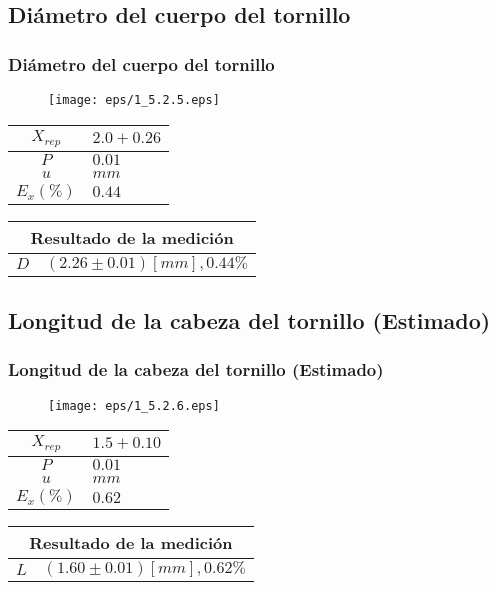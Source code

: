 \documentclass[letter,11pt]{beamer}
\begin{document}
\subsection{Diámetro del cuerpo del tornillo}
\begin{frame}
\frametitle{Diámetro del cuerpo del tornillo}
\vspace*{0.8cm}
\begin{figure}
\centering
\texttt{[image: eps/1\_5.2.5.eps]}
\end{figure}
\vspace*{0.4cm}
\scriptsize
\begin{tabular}{|c|>{\centering}m{1.8cm}<{\centering}|}
\hline
$X_{rep}$ &  $2.0+0.26$ \tabularnewline \hline
      $P$ &      $0.01$ \tabularnewline \hline
      $u$ &        $mm$ \tabularnewline \hline
$E_x(\%)$ &      $0.44$ \tabularnewline \hline
\end{tabular}
\quad
\begin{tabular}{|c|>{\centering}m{5.7cm}<{\centering}|}
\hline
\multicolumn{2}{|c|}{\textbf{Resultado de la medición}} \\ \hline
$D$ & $( 2.26\pm0.01)[mm], 0.44\%$ \tabularnewline \hline
\end{tabular}
\end{frame}

\subsection{Longitud de la cabeza del tornillo (Estimado)}
\begin{frame}
\frametitle{Longitud de la cabeza del tornillo (Estimado)}
\vspace*{0.8cm}
\begin{figure}
\centering
\texttt{[image: eps/1\_5.2.6.eps]}
\end{figure}
\vspace*{0.4cm}
\scriptsize
\begin{tabular}{|c|>{\centering}m{1.8cm}<{\centering}|}
\hline
$X_{rep}$ &  $1.5+0.10$ \tabularnewline \hline
      $P$ &      $0.01$ \tabularnewline \hline
      $u$ &        $mm$ \tabularnewline \hline
$E_x(\%)$ &      $0.62$ \tabularnewline \hline
\end{tabular}
\quad
\begin{tabular}{|c|>{\centering}m{5.7cm}<{\centering}|}
\hline
\multicolumn{2}{|c|}{\textbf{Resultado de la medición}} \\ \hline
$L$ & $( 1.60\pm0.01)[mm], 0.62\%$ \tabularnewline \hline
\end{tabular}
\end{frame}
\end{document}
